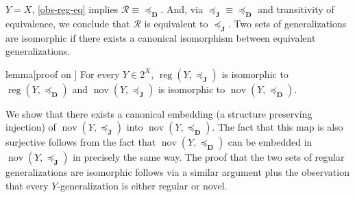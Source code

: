 \documentclass[ecta,nameyear,draft]{econsocart}
\newcommand{\reg}{\operatorname{reg}}
\newcommand{\nov}{\operatorname{nov}}
\newcommand{\mc}{\mathcal}
\newcommand{\preceqb}{\mathbin{\preceq}}
\newcommand{\ext}{\mathrel{\mc R}}
\newcommand{\extb}{\mathbin{\mc R}}
\newcommand{\mbbd}{{\mathbf D}}
\newcommand{\mbbj}{\mathbf J}
\theoremstyle{plain}
\theoremstyle{remark}
\begin{document}
\begin{appendix}
  $Y=X$, \cref{obs-reg-eq} implies $\extb\equiv \preceqb_{\mbbd}$. And, via
  $\preceqb_{\mbbj}\equiv \preceqb_{\mbbd}$ and transitivity of equivalence, we
  conclude that $\ext$ is equivalent to $\preceq_{\mbbj}$.  Two sets of
  generalizations are isomorphic if there exists a canonical isomorphism
  between equivalent generalizations. 
  \begin{theoremEnd}{lemma}[proof on ]
    \label{lem-nov-iso} For every $Y \in 2^{X}$,
    $\reg(Y, \preceqb_{\mbbj})$ is isomorphic to $\reg(Y,\preceqb_{\mbbd})$ and
    $\nov ( Y , \preceqb_{\mbbj} )$ is isomorphic to $\nov ( Y , \preceqb _
    \mbbd )$.
  \end{theoremEnd}
  \begin{proofEnd}%
    \label{proof-nov-iso} We show that there exists a canonical embedding (a
    structure preserving injection) of $\nov ( Y , \preceqb _ \mbbj )$ into
    $\nov ( Y , \preceqb _ \mbbd )$. The fact that this map is also surjective
    follows from the fact that $\nov ( Y , \preceqb _ \mbbd )$ can be embedded
    in $\nov ( Y , \preceqb _ \mbbj )$ in precisely the same way. The proof
    that the two sets of regular generalizations are isomorphic follows via a
    similar argument plus the observation that every $Y$-generalization is
    either regular or novel.


\end{proofEnd}
\end{appendix}
\end{document}
